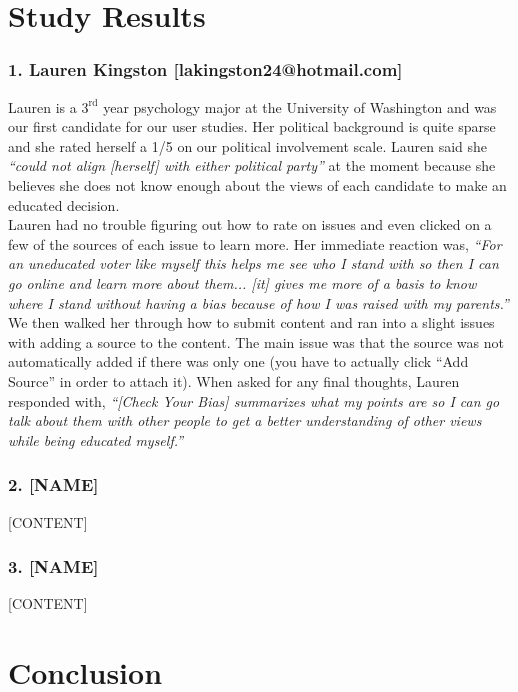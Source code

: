 \documentclass[11pt]{article}
\begin{document}
\section*{Study Results}

\subsubsection{1. Lauren Kingston [lakingston24@hotmail.com]}

Lauren is a $3^{\text{rd}}$ year psychology major at the University of Washington and was our first candidate for our user studies. Her political background is quite sparse and she rated herself a 1/5 on our political involvement scale. Lauren said she {\em``could not align [herself] with either political party''} at the moment because she believes she does not know enough about the views of each candidate to make an educated decision.\\[-9pt]

Lauren had no trouble figuring out how to rate on issues and even clicked on a few of the sources of each issue to learn more. Her immediate reaction was, {\em ``For an uneducated voter like myself this helps me see who I stand with so then I can go online and learn more about them... [it] gives me more of a basis to know where I stand without having a bias because of how I was raised with my parents.''} We then walked her through how to submit content and ran into a slight issues with adding a source to the content. The main issue was that the source was not automatically added if there was only one (you have to actually click ``Add Source'' in order to attach it). When asked for any final thoughts, Lauren responded with, {\em``[Check Your Bias] summarizes what my points are so I can go talk about them with other people to get a better understanding of other views while being educated myself.''}

\subsubsection{2. [NAME]}

[CONTENT]

\subsubsection{3. [NAME]}

[CONTENT]

\section*{Conclusion}
\end{document}
